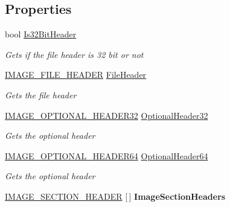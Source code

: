 \subsection*{Properties}
\begin{DoxyCompactItemize}
\item 
bool \mbox{\hyperlink{class_p_e_d_scanner_lib_1_1_struct_1_1_pe_header_reader_ab7c430566cf03dd2f912b227cc3ce429}{Is32\+Bit\+Header}}
\begin{DoxyCompactList}\small\item\em Gets if the file header is 32 bit or not \end{DoxyCompactList}\item 
\mbox{\hyperlink{struct_p_e_d_scanner_lib_1_1_struct_1_1_i_m_a_g_e___f_i_l_e___h_e_a_d_e_r}{I\+M\+A\+G\+E\+\_\+\+F\+I\+L\+E\+\_\+\+H\+E\+A\+D\+ER}} \mbox{\hyperlink{class_p_e_d_scanner_lib_1_1_struct_1_1_pe_header_reader_a58745ae2d2707ed46590335ac7c8b6b2}{File\+Header}}
\begin{DoxyCompactList}\small\item\em Gets the file header \end{DoxyCompactList}\item 
\mbox{\hyperlink{struct_p_e_d_scanner_lib_1_1_struct_1_1_pe_header_reader_1_1_i_m_a_g_e___o_p_t_i_o_n_a_l___h_e_a_d_e_r32}{I\+M\+A\+G\+E\+\_\+\+O\+P\+T\+I\+O\+N\+A\+L\+\_\+\+H\+E\+A\+D\+E\+R32}} \mbox{\hyperlink{class_p_e_d_scanner_lib_1_1_struct_1_1_pe_header_reader_ae4fcbb233eaeb2cc2835d5a910e5bf92}{Optional\+Header32}}
\begin{DoxyCompactList}\small\item\em Gets the optional header \end{DoxyCompactList}\item 
\mbox{\hyperlink{struct_p_e_d_scanner_lib_1_1_struct_1_1_pe_header_reader_1_1_i_m_a_g_e___o_p_t_i_o_n_a_l___h_e_a_d_e_r64}{I\+M\+A\+G\+E\+\_\+\+O\+P\+T\+I\+O\+N\+A\+L\+\_\+\+H\+E\+A\+D\+E\+R64}} \mbox{\hyperlink{class_p_e_d_scanner_lib_1_1_struct_1_1_pe_header_reader_a59db8bf8f6afa28f5fa3f337b13fa1a0}{Optional\+Header64}}
\begin{DoxyCompactList}\small\item\em Gets the optional header \end{DoxyCompactList}\item 
\mbox{\label{class_p_e_d_scanner_lib_1_1_struct_1_1_pe_header_reader_a7ada7b0eed1c6181c2e2a7288c22c146}} 
\mbox{\hyperlink{struct_p_e_d_scanner_lib_1_1_struct_1_1_pe_header_reader_1_1_i_m_a_g_e___s_e_c_t_i_o_n___h_e_a_d_e_r}{I\+M\+A\+G\+E\+\_\+\+S\+E\+C\+T\+I\+O\+N\+\_\+\+H\+E\+A\+D\+ER}} \mbox{[}$\,$\mbox{]} {\bfseries Image\+Section\+Headers}
\end{DoxyCompactItemize}


